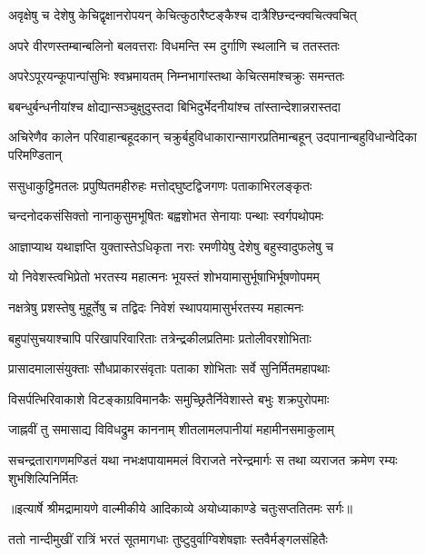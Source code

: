 \twolineshloka
{अवृक्षेषु च देशेषु केचिद्वृक्षानरोपयन्}
{केचित्कुठारैष्टङ्कैश्च दात्रैश्छिन्दन्क्वचित्क्वचित्} %

\twolineshloka
{अपरे वीरणस्तम्बान्बलिनो बलवत्तराः}
{विधमन्ति स्म दुर्गाणि स्थलानि च ततस्ततः} %

\twolineshloka
{अपरेऽपूरयन्कूपान्पांसुभिः श्वभ्रमायतम्}
{निम्नभागांस्तथा केचित्समांश्चक्रुः समन्ततः} %

\twolineshloka
{बबन्धुर्बन्धनीयांश्च क्षोद्यान्सञ्चुक्षुदुस्तदा}
{बिभिदुर्भेदनीयांश्च तांस्तान्देशान्नरास्तदा} %

\threelineshloka
{अचिरेणैव कालेन परिवाहान्बहूदकान्}
{चक्रुर्बहुविधाकारान्सागरप्रतिमान्बहून्}
{उदपानान्बहुविधान्वेदिका परिमण्डितान्} %

\twolineshloka
{ससुधाकुट्टिमतलः प्रपुष्पितमहीरुहः}
{मत्तोद्घुष्टद्विजगणः पताकाभिरलङ्कृतः} %

\twolineshloka
{चन्दनोदकसंसिक्तो नानाकुसुमभूषितः}
{बह्वशोभत सेनायाः पन्थाः स्वर्गपथोपमः} %

\twolineshloka
{आज्ञाप्याथ यथाज्ञप्ति युक्तास्तेऽधिकृता नराः}
{रमणीयेषु देशेषु बहुस्वादुफलेषु च} %

\twolineshloka
{यो निवेशस्त्वभिप्रेतो भरतस्य महात्मनः}
{भूयस्तं शोभयामासुर्भूषाभिर्भूषणोपमम्} %

\twolineshloka
{नक्षत्रेषु प्रशस्तेषु मुहूर्तेषु च तद्विदः}
{निवेशं स्थापयामासुर्भरतस्य महात्मनः} %

\twolineshloka
{बहुपांसुचयाश्चापि परिखापरिवारिताः}
{तत्रेन्द्रकीलप्रतिमाः प्रतोलीवरशोभिताः} %

\twolineshloka
{प्रासादमालासंयुक्ताः सौधप्राकारसंवृताः}
{पताका शोभिताः सर्वे सुनिर्मितमहापथाः} %

\twolineshloka
{विसर्पत्भिरिवाकाशे विटङ्काग्रविमानकैः}
{समुच्छ्रितैर्निवेशास्ते बभुः शक्रपुरोपमाः} %

\twolineshloka
{जाह्नवीं तु समासाद्य विविधद्रुम काननाम्}
{शीतलामलपानीयां महामीनसमाकुलाम्} %

\fourlineindentedshloka
{सचन्द्रतारागणमण्डितं यथा}
{नभःक्षपायाममलं विराजते}
{नरेन्द्रमार्गः स तथा व्यराजत}
{क्रमेण रम्यः शुभशिल्पिनिर्मितः} %


{॥इत्यार्षे श्रीमद्रामायणे वाल्मीकीये आदिकाव्ये अयोध्याकाण्डे चतुःसप्ततितमः सर्गः॥}


\twolineshloka
{ततो नान्दीमुखीं रात्रिं भरतं सूतमागधाः}
{तुष्टुवुर्वाग्विशेषज्ञाः स्तवैर्मङ्गलसंहितैः} %

